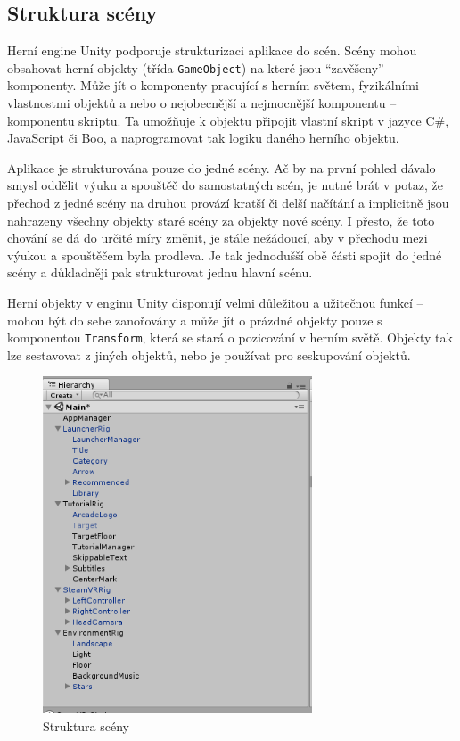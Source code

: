 \subsection{Struktura scény}\label{struktura-scuxe9ny}

Herní engine Unity podporuje strukturizaci aplikace do scén. Scény mohou
obsahovat herní objekty (třída \texttt{GameObject}) na které jsou
``zavěšeny'' komponenty. \autocite{unityscenes} Může jít o komponenty pracující s herním
světem, fyzikálními vlastnostmi objektů a nebo o nejobecnější a
nejmocnější komponentu -- komponentu skriptu. Ta umožňuje k objektu
připojit vlastní skript v jazyce C\#, JavaScript či Boo, a naprogramovat
tak logiku daného herního objektu.

Aplikace je strukturována pouze do jedné scény. Ač by na první pohled
dávalo smysl oddělit výuku a spouštěč do samostatných scén, je nutné
brát v potaz, že přechod z jedné scény na druhou provází kratší či delší
načítání a implicitně jsou nahrazeny všechny objekty staré scény za
objekty nové scény. I přesto, že toto chování se dá do určité míry
změnit, je stále nežádoucí, aby v přechodu mezi výukou a spouštěčem
byla prodleva. Je tak jednodušší obě části spojit do jedné scény a
důkladněji pak strukturovat jednu hlavní scénu.

Herní objekty v enginu Unity disponují velmi důležitou a užitečnou
funkcí -- mohou být do sebe zanořovány a může jít o prázdné objekty
pouze s komponentou \texttt{Transform}, která se stará o pozicování v
herním světě. Objekty tak lze sestavovat z jiných objektů, nebo je
používat pro seskupování objektů.

\newpage

\begin{figure}[h!]
\centering
\includegraphics[height=10cm]{src/assets/structure.png}
\caption{Struktura scény}
\end{figure}

